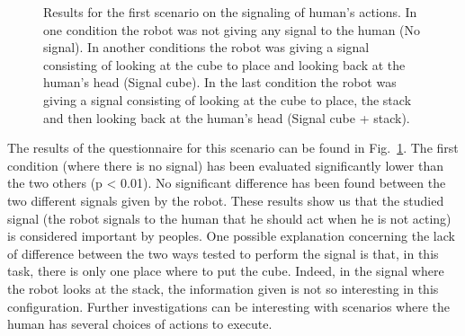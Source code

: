 \documentclass[english,a4paper,11pt,twoside]{StyleThese}
\begin{document}
\begin{figure}[!h]
\centering
    \caption{Results for the first scenario on the signaling of human's actions. In one condition the robot was not giving any signal to the human (No signal). In another conditions the robot was giving a signal consisting of looking at the cube to place and looking back at the human's head (Signal cube). In the last condition the robot was giving a signal consisting of looking at the cube to place, the stack and then looking back at the human's head (Signal cube + stack).}
    \label{fig:resSce4}
\end{figure}

The results of the questionnaire for this scenario can be found in Fig.~\ref{fig:resSce4}. The first condition (where there is no signal) has been evaluated significantly lower than the two others (p < 0.01). No significant difference has been found between the two different signals given by the robot. These results show us that the studied signal (the robot signals to the human that he should act when he is not acting) is considered important by peoples. One possible explanation concerning the lack of difference between the two ways tested to perform the signal is that, in this task, there is only one place where to put the cube. Indeed, in the signal where the robot looks at the stack, the information given is not so interesting in this configuration. Further investigations can be interesting with scenarios where the human has several choices of actions to execute.
\end{document}
